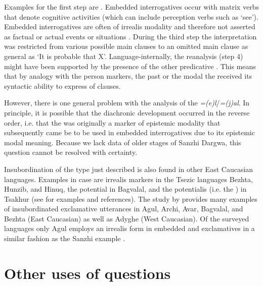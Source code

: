 Examples for the first step are . Embedded interrogatives occur with matrix verbs that denote cognitive activities (which can include perception verbs such as ‘see'). Embedded interrogatives are often of irrealis modality and therefore not asserted as factual or actual events or situations . During the third step the interpretation was restricted from various possible main clauses to an omitted main clause as general as ‘It is probable that X'. Language-internally, the reanalysis (step 4) might have been supported by the presence of the other predicative . This means that by analogy with the person markers, the past  or the modal  the  received its syntactic ability to express  of clauses.

However, there is one general problem with the  analysis of the  \textit{=(e)l}\slash\textit{=(j)al}. In principle, it is possible that the diachronic development occurred in the reverse order, i.e. that the  was originally a marker of epistemic modality that subsequently came be to be used in embedded interrogatives due to its epistemic modal meaning. Because we lack data of older stages of Sanzhi Dargwa, this question cannot be resolved with certainty.

Insubordination of the type just described is also found in other East Caucasian languages. Examples in case are irrealis markers in the Tsezic languages Bezhta, Hunzib, and Hinuq, the potential  in Bagvalal, and the potentialis (i.e. the ) in Tsakhur (see \citet{ComrieForkerKhalilova2016} for examples and references). The study by \citep{Kalinina2011} provides many examples of insubordinated exclamative utterances in Agul, Archi, Avar, Bagvalal, and Bezhta (East Caucasian) as well as Adyghe (West Caucasian). Of the surveyed languages only Agul employs an irrealis  form in embedded  and exclamatives in a similar fashion as the Sanzhi example .







\section{Other uses of questions}
\label{sec:Other uses of questions}


